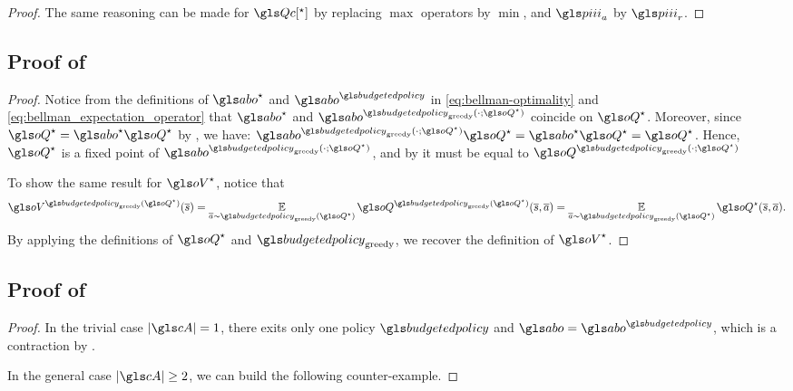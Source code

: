 \begin{subappendices}
\begin{proof}
    The same reasoning can be made for $\Qc[^\star]$ by replacing $\max$ operators by $\min$, and $\policies_a$ by $\policies_r$.
\end{proof}


\subsection{Proof of }
\begin{proof}
    Notice from the definitions of $\abo^{\star}$ and $\abo^{\budgetedpolicy}$ in \eqref{eq:bellman-optimality} and \eqref{eq:bellman_expectation_operator} that $\abo^{\star}$ and $\abo^{\budgetedpolicy_\text{greedy}(\cdot;\oQ^{\star})}$ coincide on $\oQ^{\star}$. Moreover, since $\oQ^{\star} = \abo^{\star}\oQ^{\star}$ by , we have: $\abo^{\budgetedpolicy_\text{greedy}(\cdot;\oQ^{\star})} \oQ^{\star} = \abo^{\star} \oQ^{\star} = \oQ^{\star}$.
    Hence, $\oQ^{\star}$ is a fixed point of $\abo^{\budgetedpolicy_\text{greedy}(\cdot;\oQ^{\star})}$, and by  it must be equal to $\oQ^{\budgetedpolicy_\text{greedy}(\cdot;\oQ^{\star})}$

    To show the same result for $\oV^{\star}$, notice that
    \begin{equation*}
        \oV^{\budgetedpolicy_\text{greedy}(\oQ^{\star})}(\os) = \expectedvalueover{\oa\sim\budgetedpolicy_\text{greedy}(\oQ^{\star})}\oQ^{\budgetedpolicy_\text{greedy}(\oQ^{\star})}(\os,\oa) = \expectedvalueover{\oa\sim\budgetedpolicy_\text{greedy}(\oQ^{\star})}\oQ^{\star}(\os,\oa).
    \end{equation*}
    By applying the definitions of $\oQ^{\star}$ and $\budgetedpolicy_\text{greedy}$, we recover the definition of $\oV^{\star}$.
\end{proof}

\subsection{Proof of }
\label{sec:proof_contraction}
\begin{proof}
	In the trivial case $|\cA| = 1$, there exits only one policy $\budgetedpolicy$ and $\abo = \abo^\budgetedpolicy$, which is a contraction by .
	
	In the general case $|\cA| \geq 2$, we can build the following counter-example.
	

\end{proof}
\end{subappendices}
